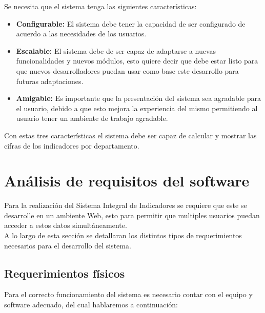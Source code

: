 		Se necesita que el sistema tenga las siguientes caracter\'isticas:

		\begin{itemize}
			\item \textbf{Configurable:} El sistema debe tener la capacidad de ser configurado de acuerdo a las necesidades de los usuarios.
			\item \textbf{Escalable:} El sistema debe de ser capaz de adaptarse a nuevas funcionalidades y nuevos m\'odulos, esto quiere decir que debe estar listo para que nuevos desarrolladores puedan usar como base este desarrollo para futuras adaptaciones.
			\item \textbf{Amigable:} Es importante que la presentaci\'on del sistema sea agradable para el usuario, debido a que esto mejora la experiencia del mismo permitiendo al usuario tener un ambiente de trabajo agradable.
		\end{itemize}
		
		Con estas tres caracter\'isticas el sistema debe ser capaz de calcular y mostrar las cifras de los indicadores por departamento.

	\section{An\'alisis de requisitos del software}

		Para la realizaci\'on del Sistema Integral de Indicadores se requiere que este se desarrolle en un ambiente Web, esto para permitir que multiples usuarios puedan acceder a estos datos simult\'aneamente.\\

		A lo largo de esta secci\'on se detallaran los distintos tipos de requerimientos necesarios para el desarrollo del sistema.\\

		\subsection{Requerimientos f\'isicos}
			Para el correcto funcionamiento del sistema es necesario contar con el equipo y software  adecuado, del cual hablaremos a continuaci\'on:

